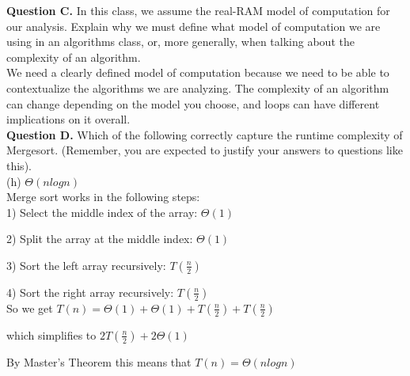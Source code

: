 \documentclass[12pt]{article}
\begin{document}
\textbf{Question C.} In this class, we assume the real-RAM model of computation for our analysis. Explain why we must define what model of computation we are using in an algorithms class, or, more generally, when talking about the complexity of an algorithm.\\

We need a clearly defined model of computation because we need to be able to contextualize the algorithms we are analyzing. The complexity of an algorithm can change depending on the model you choose, and loops can have different implications on it overall.\\

\textbf{Question D.} Which of the following correctly capture the runtime complexity of Mergesort. (Remember, you are expected to justify your answers to questions like this).\\

(h) $\Theta(n log n)$\\

Merge sort works in the following steps:\\

1) Select the middle index of the array: $\Theta(1)$

2) Split the array at the middle index: $\Theta(1)$

3) Sort the left array recursively: $T(\frac{n}{2})$

4) Sort the right array recursively: $T(\frac{n}{2})$\\

So we get $T(n) = \Theta(1) + \Theta(1) + T(\frac{n}{2}) + T(\frac{n}{2})$ 

which simplifies to $2T(\frac{n}{2}) + 2\Theta(1)$

By Master's Theorem this means that $T(n) = \Theta(n log n)$
\end{document}
